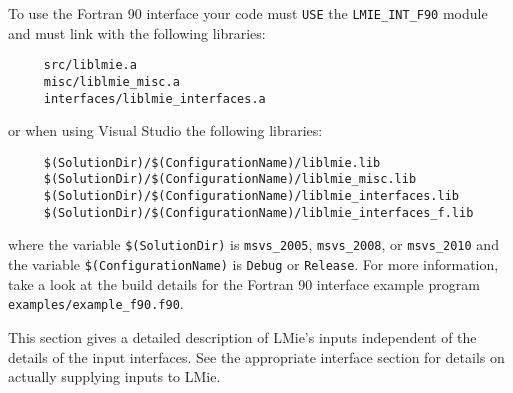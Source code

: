 To use the Fortran 90 interface your code must \texttt{USE} the \texttt{LMIE\_INT\_F90} module
and must link with the following libraries:
\begin{verbatim}
     src/liblmie.a
     misc/liblmie_misc.a
     interfaces/liblmie_interfaces.a
\end{verbatim}
or when using Visual Studio the following libraries:
\begin{verbatim}
     $(SolutionDir)/$(ConfigurationName)/liblmie.lib
     $(SolutionDir)/$(ConfigurationName)/liblmie_misc.lib
     $(SolutionDir)/$(ConfigurationName)/liblmie_interfaces.lib
     $(SolutionDir)/$(ConfigurationName)/liblmie_interfaces_f.lib
\end{verbatim}
where the variable \texttt{\$(SolutionDir)} is \texttt{msvs\_2005}, \texttt{msvs\_2008}, or \texttt{msvs\_2010} and the variable \texttt{\$(ConfigurationName)} is \texttt{Debug} or \texttt{Release}.  For more information, take a look at the build details for the Fortran 90 interface example program \texttt{examples/example\_f90.f90}.


%
\label{lmie_inputs}

This section gives a detailed description of LMie's inputs independent of the details of the input interfaces.  See the appropriate interface section for details on actually supplying inputs to LMie.

